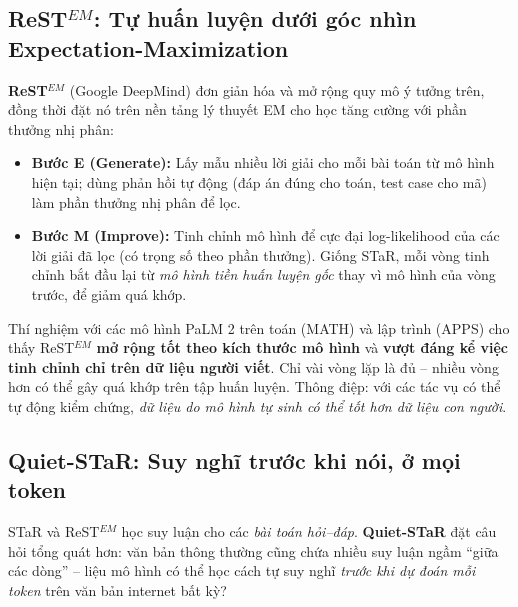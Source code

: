 \subsection{ReST\texorpdfstring{$^{EM}$}{-EM}: Tự huấn luyện dưới góc nhìn Expectation-Maximization}
\label{ssec:restem}
\textbf{ReST$^{EM}$} \cite{singh2024restem} (Google DeepMind) đơn giản hóa và mở rộng quy mô ý tưởng trên, đồng thời đặt nó trên nền tảng lý thuyết EM cho học tăng cường với phần thưởng nhị phân:
\begin{itemize}
	\item \textbf{Bước E (Generate):} Lấy mẫu nhiều lời giải cho mỗi bài toán từ mô hình hiện tại; dùng phản hồi tự động (đáp án đúng cho toán, test case cho mã) làm phần thưởng nhị phân để lọc.
	\item \textbf{Bước M (Improve):} Tinh chỉnh mô hình để cực đại log-likelihood của các lời giải đã lọc (có trọng số theo phần thưởng). Giống STaR, mỗi vòng tinh chỉnh bắt đầu lại từ \emph{mô hình tiền huấn luyện gốc} thay vì mô hình của vòng trước, để giảm quá khớp.
\end{itemize}
Thí nghiệm với các mô hình PaLM 2 trên toán (MATH) và lập trình (APPS) cho thấy ReST$^{EM}$ \textbf{mở rộng tốt theo kích thước mô hình} và \textbf{vượt đáng kể việc tinh chỉnh chỉ trên dữ liệu người viết}. Chỉ vài vòng lặp là đủ -- nhiều vòng hơn có thể gây quá khớp trên tập huấn luyện. Thông điệp: với các tác vụ có thể tự động kiểm chứng, \emph{dữ liệu do mô hình tự sinh có thể tốt hơn dữ liệu con người}.

\subsection{Quiet-STaR: Suy nghĩ trước khi nói, ở mọi token}
\label{ssec:quiet_star}
STaR và ReST$^{EM}$ học suy luận cho các \emph{bài toán hỏi--đáp}. \textbf{Quiet-STaR} \cite{zelikman2024quietstar} đặt câu hỏi tổng quát hơn: văn bản thông thường cũng chứa nhiều suy luận ngầm “giữa các dòng” -- liệu mô hình có thể học cách tự suy nghĩ \emph{trước khi dự đoán mỗi token} trên văn bản internet bất kỳ?

